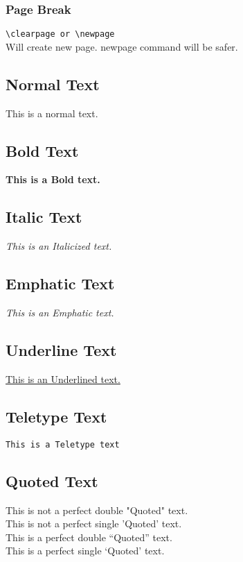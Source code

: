 \documentclass[10pt]{article}
\begin{document}
{\subsubsection{Page Break}
\verb|\clearpage or \newpage| \\
Will create new page.
newpage command will be safer.

\subsection{Normal Text}
This is a normal text.

\subsection{Bold Text}
\textbf{This is a Bold text.}

\subsection{Italic Text}
\textit{This is an Italicized text.}

\subsection{Emphatic Text}
\emph{This is an Emphatic text.}

\subsection{Underline Text}
\underline{This is an Underlined text.}

\subsection{Teletype Text}
\texttt{This is a Teletype text}

\subsection{Quoted Text}
This is not a perfect double "Quoted" text. \\
This is not a perfect single 'Quoted' text. \\
This is a perfect double ``Quoted'' text. \\
This is a perfect single `Quoted' text.

}
\end{document}
